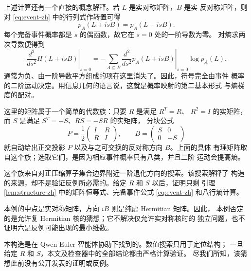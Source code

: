 \documentclass[UTF8,11pt,a4paper]{ctexart}
\begin{document}
上述计算还有一个直接的概念解释。若 $L$ 是实对称矩阵，$B$ 是实
反对称矩阵，则对 \eqref{eq:event-zh} 中的行列式作转置可得
\[
 p_A(L+isB)=p_A(L-isB).
\]
每个完备事件概率都是 $s$ 的偶函数，故它在 $s=0$ 处的一阶导数为零。
对熵求两次导数便得到
\begin{equation}\label{eq:second-derivative-zh}
 \left.\frac{d^2}{ds^2}H(L+isB)\right|_{s=0}
 =-\sum_{A\subseteq E}
 \left.\frac{d^2}{ds^2}p_A(L+isB)\right|_{s=0}\log p_A(L).
\end{equation}
通常为负、由一阶导数平方组成的项在这里消失了。因此，符号完全由事件
概率的二阶运动决定。用信息几何的语言说，这就是概率映射的第二基本形式
与熵梯度的配对。

这里的矩阵属于一个简单的代数族：只要 $R$ 是满足 $R^T=R$、
$R^2=I$ 的实矩阵，而 $S$ 是满足 $S^T=-S$、$RS=-SR$ 的实矩阵，
分块公式
\[
 P=\frac12\begin{pmatrix}I&R\\R&I\end{pmatrix},
 \qquad
 B=\begin{pmatrix}S&0\\0&-S\end{pmatrix}
\]
就自动给出正交投影 $P$ 以及与之可交换的反对称方向 $B$。上面的具体
有理矩阵取自这个族；选取它们，是因为相应事件概率只有八类，并且二阶
运动会提高熵。

这个族来自对正压缩算子集合边界附近一阶退化方向的搜索。该搜索解释了
构造的来源，却不是验证反例所必需的。给定 $R$ 和 $S$ 以后，证明只剩
引理 \ref{lem:structure-zh} 中的矩阵恒等式、完备事件公式
\eqref{eq:event-zh} 和八行熵计算。

本例的中点是实对称矩阵，方向 $iB$ 则是纯虚 Hermitian 矩阵。因此，
本例否定的是允许复 Hermitian 核的猜想；它不解决仅允许实对称核时的
独立问题，也不证明六是反例可能出现的最小维数。

本构造是在 Qwen Euler 智能体协助下找到的。数值搜索只用于定位结构；
一旦给定 $R$ 和 $S$，本文及检查器中的全部结论都由严格计算验证。
尽我们所知，该猜想此前没有公开发表的证明或反例。



\end{document}
